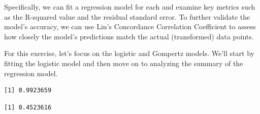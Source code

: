 \documentclass[
  letterpaper,
]{book}
\newenvironment{Shaded}{\begin{snugshade}}{\end{snugshade}}
\newcommand{\AttributeTok}[1]{\textcolor[rgb]{0.40,0.45,0.13}{#1}}
\newcommand{\CommentTok}[1]{\textcolor[rgb]{0.37,0.37,0.37}{#1}}
\newcommand{\DecValTok}[1]{\textcolor[rgb]{0.68,0.00,0.00}{#1}}
\newcommand{\FunctionTok}[1]{\textcolor[rgb]{0.28,0.35,0.67}{#1}}
\newcommand{\NormalTok}[1]{\textcolor[rgb]{0.00,0.23,0.31}{#1}}
\newcommand{\OtherTok}[1]{\textcolor[rgb]{0.00,0.23,0.31}{#1}}
\newcommand{\SpecialCharTok}[1]{\textcolor[rgb]{0.37,0.37,0.37}{#1}}
\newcommand{\StringTok}[1]{\textcolor[rgb]{0.13,0.47,0.30}{#1}}
\begin{document}
Specifically, we can fit a regression model for each and examine key
metrics such as the R-squared value and the residual standard error. To
further validate the model's accuracy, we can use Lin's Concordance
Correlation Coefficient to assess how closely the model's predictions
match the actual (transformed) data points.

For this exercise, let's focus on the logistic and Gompertz models.
We'll start by fitting the logistic model and then move on to analyzing
the summary of the regression model.

\begin{Shaded}
\end{Shaded}

\begin{verbatim}
[1] 0.9923659
\end{verbatim}

\begin{Shaded}
\end{Shaded}

\begin{verbatim}
[1] 0.4523616
\end{verbatim}

\begin{Shaded}
\end{Shaded}
\end{document}
